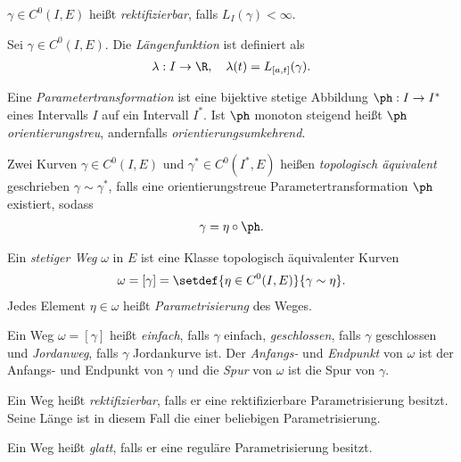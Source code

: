 \begin{defn}
$\gamma\in C^0(I,E)$ heißt \emph{rektifizierbar}, falls $L_I(\gamma) <
\infty$.
\end{defn}
\begin{defn}
Sei $\gamma\in C^0(I,E)$. Die \emph{Längenfunktion} ist definiert als
\begin{align*}
\lambda : I \to \R,\quad \lambda(t) = L_{[a,t]}(\gamma).
\end{align*}
\end{defn}
\begin{defn}
Eine \emph{Parametertransformation} ist eine bijektive stetige Abbildung $\ph:
I\to I^*$ eines Intervalls $I$ auf ein Intervall $I^*$. Ist $\ph$ monoton steigend
heißt $\ph$ \emph{orientierungstreu}, andernfalls \emph{orientierungsumkehrend}.
\end{defn}
\begin{defn}
Zwei Kurven $\gamma \in C^0(I,E)$ und $\gamma^*\in C^0(I^*,E)$ heißen
\emph{topologisch äquivalent} geschrieben $\gamma\sim\gamma^*$, falls eine
orientierungstreue Parametertransformation $\ph$ existiert, sodass
\begin{align*}
\gamma = \eta\circ\ph.
\end{align*}
\end{defn}
\begin{defn}
Ein \emph{stetiger Weg} $\omega$ in $E$ ist eine Klasse topologisch äquivalenter
Kurven
\begin{align*}
\omega = [\gamma] = \setdef{\eta\in C^0(I,E)}{\gamma\sim\eta}.
\end{align*}
Jedes Element $\eta\in\omega$ heißt \emph{Parametrisierung} des Weges.
\end{defn}
\begin{defn}
Ein Weg $\omega = [\gamma]$ heißt \emph{einfach}, falls $\gamma$ einfach,
\emph{geschlossen}, falls $\gamma$ geschlossen und \emph{Jordanweg}, falls
$\gamma$ Jordankurve ist. Der \emph{Anfangs-} und \emph{Endpunkt} von $\omega$
ist der Anfangs- und Endpunkt von $\gamma$ und die \emph{Spur} von $\omega$ ist
die Spur von $\gamma$.
\end{defn}
\begin{defn}
Ein Weg heißt \emph{rektifizierbar}, falls er eine rektifizierbare
Parametrisierung besitzt. Seine Länge ist in diesem Fall die einer beliebigen
Parametrisierung.
\end{defn}
\begin{defn}
Ein Weg heißt \emph{glatt}, falls er eine reguläre Parametrisierung besitzt.
\end{defn}

